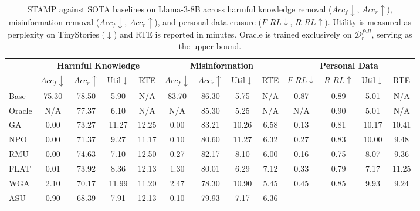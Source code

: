 \begin{table}[htbp]
\centering
\caption{STAMP against SOTA baselines on Llama-3-8B across harmful knowledge removal ($Acc_f\!\downarrow$, $Acc_r\!\uparrow$), misinformation removal ($Acc_f\!\downarrow$, $Acc_r\!\uparrow$), and personal data erasure ($F$-$RL\!\downarrow$, $R$-$RL\!\uparrow$). Utility is measured as perplexity on TinyStories ($\downarrow$) and RTE is reported in minutes. Oracle is trained exclusively on $\mathcal{D}_r^{\textit{full}}$, serving as the upper bound.}
\label{tab:STAMP-Comparison}
\footnotesize
\renewcommand{\arraystretch}{1.2}
\setlength{\tabcolsep}{3.5pt}
\begin{adjustbox}{max width=\textwidth}
\begin{tabular}{p{1.7cm}|cccc|cccc|cccc}
\Xhline{1.15pt}
\multirow{2}{*}{\textbf{Method}} &
\multicolumn{4}{c|}{\textbf{Harmful Knowledge}} &
\multicolumn{4}{c|}{\textbf{Misinformation}} &
\multicolumn{4}{c}{\textbf{Personal Data}} \\
\cmidrule(lr){2-5}\cmidrule(lr){6-9}\cmidrule(lr){10-13}
& $Acc_f{\downarrow}$ & $Acc_r{\uparrow}$ & Util$\downarrow$ & RTE
& $Acc_f{\downarrow}$ & $Acc_r{\uparrow}$ & Util$\downarrow$ & RTE
& $F\text{-}RL{\downarrow}$ & $R\text{-}RL{\uparrow}$ & Util$\downarrow$ & RTE \\
\Xhline{1.15pt}
Base
  & 75.30 & 78.50 & 5.90 & N/A
  & 83.70 & 86.30 & 5.75 & N/A
  & 0.87  & 0.89  & 5.01 & N/A \\
\rowcolor{gray!15}
Oracle
  & N/A   & 77.37 & 6.10 & N/A
  & N/A   & 85.30 & 5.25 & N/A
  & N/A   & 0.90  & 5.01 & N/A \\
\midrule
GA
  & 0.00 & 73.27 & 11.27 & 12.25
  & 0.00 & 83.21 & 10.26 & 6.58
  & 0.13 & 0.81  & 10.17 & 10.41 \\
\rowcolor{gray!15}
NPO
  & 0.00 & 71.37 & 9.27  & 11.17
  & 0.10 & 80.60 & 11.27 & 6.32
  & 0.27 & 0.83  & 10.00 & 9.48 \\
RMU
  & 0.00 & \colorbox{yellow!40}{74.63} & \colorbox{yellow!40}{7.10} & 12.50
  & 0.27 & 82.17 & 8.10  & 6.00
  & 0.16 & 0.75  & 8.07  & 9.36 \\
\rowcolor{gray!15}
FLAT
  & 0.01 & 73.92 & 8.36  & 12.13
  & 1.30 & 80.01 & 6.29  & 7.12
  & 0.33 & 0.79  & \colorbox{yellow!40}{7.17} & 11.25 \\
WGA
  & 2.10 & 70.17 & 11.99 & 11.20
  & 2.47 & 78.30 & 10.90 & \colorbox{yellow!40}{5.45}
  & 0.45 & 0.85  & 9.93  & 9.24 \\
\rowcolor{gray!15}
ASU
  & 0.90 & 68.39 & 7.91  & 12.13
  & 0.10 & 79.93 & 7.17  & 6.36

\end{tabular}
\end{adjustbox}
\end{table}
